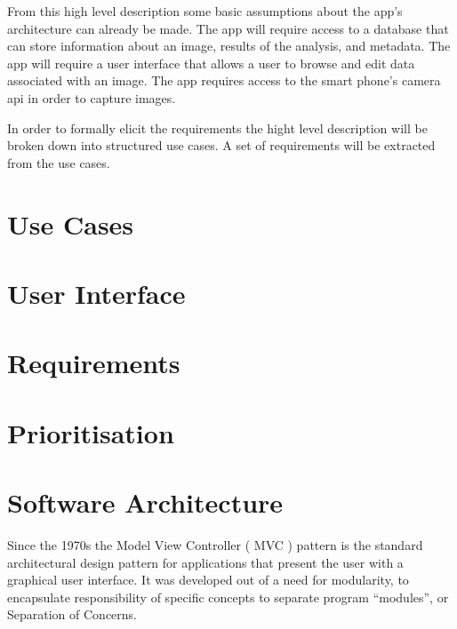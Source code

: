 From this high level description some basic assumptions about the app’s architecture can already be made. The app will require access to a database that can store information about an image, results of the analysis, and metadata. The app will require a user interface that allows a user to browse and edit data associated with an image. The app requires access to the smart phone’s camera api in order to capture images.

In order to formally elicit the requirements the hight level description will be broken down into structured use cases. A set of requirements will be extracted from the use cases.

\section{Use Cases}




\section{User Interface}


\section{Requirements}














\section{Prioritisation}


\section{Software Architecture}
Since the 1970s the Model View Controller ( MVC ) pattern is the standard architectural design pattern for applications that present the user with a graphical user interface. It was developed out of a need for modularity, to encapsulate responsibility of specific concepts to separate program “modules”, or Separation of Concerns.

